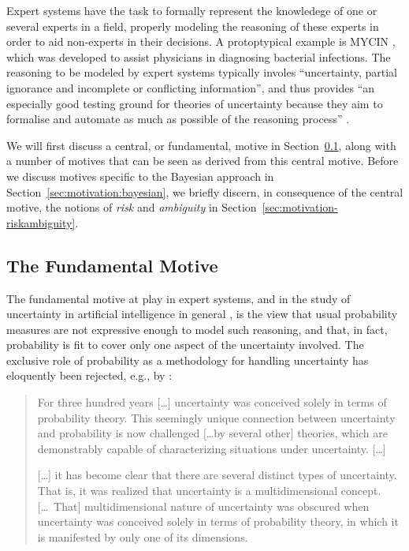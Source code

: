 Expert systems have the task to formally represent the knowledege of one or several experts in a field,
properly modeling the reasoning of these experts in order to aid non-experts in their decisions.
A protoptypical example is MYCIN \parencite{1976:shortliffe},
which was developed to assist physicians in diagnosing bacterial infections.
The reasoning to be modeled by expert systems typically involes
``uncertainty, partial ignorance and incomplete or conflicting information'', and thus provides
``an especially good testing ground for theories of uncertainty
because they aim to formalise and automate as much as possible
of the reasoning process'' \parencite[p.~2]{1996:walley::expert}.

We will first discuss a central, or fundamental, motive in Section~\ref{sec:motivation-fundamental},
along with a number of motives that can be seen as derived from this central motive.
Before we discuss motives specific to the Bayesian approach in Section~\ref{sec:motivation:bayesian},
we briefly discern, in consequence of the central motive, the notions of \emph{risk} and \emph{ambiguity}
in Section~\ref{sec:motivation-riskambiguity}.

\subsection{The Fundamental Motive}
\label{sec:motivation-fundamental}

The fundamental motive at play in expert systems,
and in the study of uncertainty in artificial intelligence in general \parencite[see, e.g.,][]{2006:lawry},
is the view that usual probability measures
are not expressive enough to model such reasoning,
and that, in fact, probability is fit to cover only one aspect of the uncertainty involved.
The exclusive role of probability as a methodology for handling uncertainty has eloquently been rejected,
e.g., by \textcite[p.~1]{1999:klir}: 
\begin{quotation}
For three hundred years [\ldots] uncertainty was conceived solely in
terms of probability theory. This seemingly unique connection
between uncertainty and probability is now challenged [\ldots by several
other] theories, which are demonstrably capable of characterizing
situations under uncertainty. [\ldots]

[\ldots] it has become clear that there are several distinct types of
uncertainty. That is, it was realized that uncertainty is a
multidimensional concept. [\ldots\ That] multidimensional nature of
uncertainty was obscured when uncertainty was conceived solely in
terms of probability theory, in which it is manifested by only one
of its dimensions.
\end{quotation}

